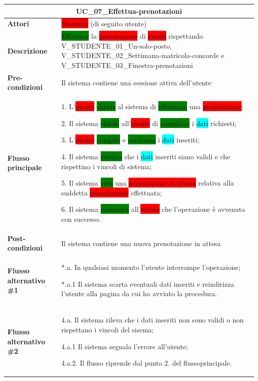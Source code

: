 \documentclass[11pt]{article}
\begin{document}
\begin{table}[H]
\centering
\begin{tabularx}{1\textwidth}{|l|X|}
\hline
\multicolumn{2}{|c|}{\textbf{UC\_07\_Effettua-prenotazioni}}\\
\hline \textbf{Attori} & \colorbox{red}{Studente} (di seguito utente)\\
\hline \textbf{Descrizione} & \colorbox{green}{Effetuare} la \colorbox{red}{prenotazione} di \colorbox{red}{eventi} rispettando V\_STUDENTE\_01\_Un-solo-posto, V\_STUDENTE\_02\_Settimana-matricola-concorde e V\_STUDENTE\_03\_Finestra-prenotazioni\\
\hline \textbf{Pre-condizioni} & Il sistema contiene una sessione attiva dell'utente\\
\hline \textbf{Flusso principale} & 
1. L'\colorbox{red}{utente} \colorbox{green}{chiede} al sistema di \colorbox{green}{effettuare} una \colorbox{red}{prenotazione};

2. Il sistema \colorbox{green}{chiede} all'\colorbox{red}{utente} di \colorbox{green}{compilare} i \colorbox{cyan}{dati} richiesti;

3. L'\colorbox{red}{utente} \colorbox{green}{compila} e \colorbox{green}{conferma} i \colorbox{cyan}{dati} inseriti;

4. Il sistema \colorbox{green}{verifica} che i \colorbox{cyan}{dati} inseriti siano validi e che rispettino i vincoli di sistema;

5. Il sistema \colorbox{green}{crea} una \colorbox{red}{prenotazione in attesa} relativa alla suddetta \colorbox{red}{prenotazione} effettuata;

6. Il sistema \colorbox{green}{comunica} all'\colorbox{red}{utente} che l'operazione è avvenuta con successo.
\\
\hline \textbf{Post-condizioni} & Il sistema contiene una nuova prenotazione in attesa\\
\hline \textbf{Flusso alternativo \#1} & 
*.a. In qualsiasi momento l'utente interrompe l'operazione;

*.a.1 Il sistema scarta eventuali dati inseriti e reindirizza l'utente alla pagina da cui ha avviato la procedura.\\
\hline \textbf{Flusso alternativo \#2} &
4.a. Il sistema rileva che i dati inseriti non sono validi o non rispettano i vincoli del sisema;

4.a.1 Il sistema segnala l'errore all'utente;

4.a.2. Il flusso riprende dal punto 2. del flussoprincipale.
\\ 
\hline
\end{tabularx}
\end{table}
\end{document}

